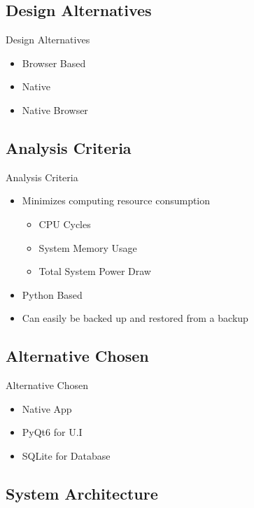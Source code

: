 \documentclass[17pt, aspectratio=169]{beamer}
\begin{document}
\subsection{Design Alternatives}
\begin{frame}{Design Alternatives}
	\begin{itemize}
		\item Browser Based
		\item Native
		\item Native Browser
	\end{itemize}
\end{frame}
\subsection*{Analysis Criteria}
\begin{frame}{Analysis Criteria}
	\begin{itemize}
		\item Minimizes computing resource consumption
		      \begin{itemize}
			      \item CPU Cycles
			      \item System Memory Usage
			      \item Total System Power Draw
		      \end{itemize}
		\item Python Based
		\item Can easily be backed up and restored from a backup
	\end{itemize}
\end{frame}
\subsection*{Alternative Chosen}
\begin{frame}{Alternative Chosen}
	\begin{itemize}
		\item Native App
		\item PyQt6 for U.I
		\item SQLite for Database
	\end{itemize}
\end{frame}
\subsection{System Architecture}
\end{document}
